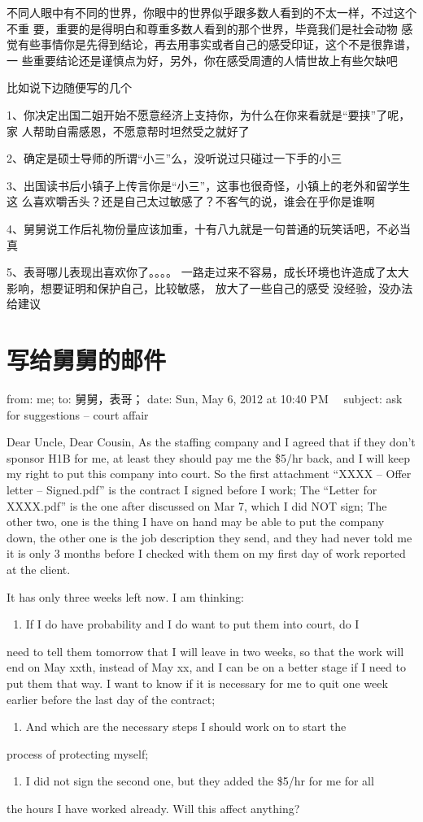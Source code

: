 \documentclass[12pt]{book}
\begin{document}
不同人眼中有不同的世界，你眼中的世界似乎跟多数人看到的不太一样，不过这个不重
要，重要的是得明白和尊重多数人看到的那个世界，毕竟我们是社会动物
感觉有些事情你是先得到结论，再去用事实或者自己的感受印证，这个不是很靠谱，一
些重要结论还是谨慎点为好，另外，你在感受周遭的人情世故上有些欠缺吧

比如说下边随便写的几个

1、你决定出国二姐开始不愿意经济上支持你，为什么在你来看就是“要挟”了呢，家
人帮助自需感恩，不愿意帮时坦然受之就好了

2、确定是硕士导师的所谓“小三”么，没听说过只碰过一下手的小三

3、出国读书后小镇子上传言你是“小三”，这事也很奇怪，小镇上的老外和留学生这
么喜欢嚼舌头？还是自己太过敏感了？不客气的说，谁会在乎你是谁啊

4、舅舅说工作后礼物份量应该加重，十有八九就是一句普通的玩笑话吧，不必当真

5、表哥哪儿表现出喜欢你了。。。。
一路走过来不容易，成长环境也许造成了太大影响，想要证明和保护自己，比较敏感，
放大了一些自己的感受
没经验，没办法给建议
\section{写给舅舅的邮件}
\label{sec-9-94}

from: me; to: 舅舅，表哥；
date: Sun, May 6, 2012 at 10:40 PM　
subject: ask for suggestions -- court affair

Dear Uncle, Dear Cousin, 
As the staffing company and I agreed that if they don’t sponsor H1B for me,
at least they should pay me the \$5/hr back, and I will keep my right to put
this company into court. 
So the first attachment “XXXX – Offer letter – Signed.pdf” is the 
contract I signed before I work;
The “Letter for XXXX.pdf” is the one after discussed on Mar 7, which I did
NOT sign;
The other two, one is the thing I have on hand may be able to put the 
company down, the other one is the job description they send, and they had 
never told me it is only 3 months before I checked with them on my first day
of work reported at the client. 

It has only three weeks left now. I am thinking: 
\begin{enumerate}
\item If I do have probability and I do want to put them into court, do I
\end{enumerate}
need to tell them tomorrow that I will leave in two weeks, so that the work 
will end on May xxth, instead of May xx, and I can be on a better stage if I
need to put them that way. I want to know if it is necessary for me to quit
one week earlier before the last day of the contract; 
\begin{enumerate}
\item And which are the necessary steps I should work on to start the
\end{enumerate}
process of protecting myself;
\begin{enumerate}
\item I did not sign the second one, but they added the \$5/hr for me for all
\end{enumerate}
the hours I have worked already. Will this affect anything?
\end{document}
